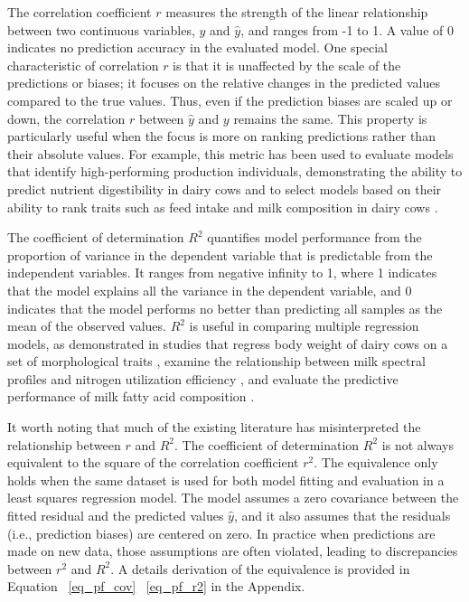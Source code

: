 The correlation coefficient \(r\) measures the strength of the linear relationship between two continuous variables, \(y\) and \(\hat{y}\), and ranges from -1 to 1. A value of 0 indicates no prediction accuracy in the evaluated model. One special characteristic of correlation \(r\) is that it is unaffected by the scale of the predictions or biases; it focuses on the relative changes in the predicted values compared to the true values. Thus, even if the prediction biases are scaled up or down, the correlation \(r\) between \(\hat{y}\) and \(y\) remains the same. This property is particularly useful when the focus is more on ranking predictions rather than their absolute values. For example, this metric has been used to evaluate models that identify high-performing production individuals, demonstrating the ability to predict nutrient digestibility in dairy cows \citep{de_souza_predicting_2018} and to select models based on their ability to rank traits such as feed intake and milk composition in dairy cows \citep{dorea_mining_2018,rovere_prediction_2021}.

The coefficient of determination \(R^2\) quantifies model performance from the proportion of variance in the dependent variable that is predictable from the independent variables. It ranges from negative infinity to 1, where 1 indicates that the model explains all the variance in the dependent variable, and 0 indicates that the model performs no better than predicting all samples as the mean of the observed values. \(R^2\) is useful in comparing multiple regression models, as demonstrated in studies that regress body weight of dairy cows on a set of morphological traits \citep{xavier_use_2022}, examine the relationship between milk spectral profiles and nitrogen utilization efficiency \citep{grelet_potential_2020}, and evaluate the predictive performance of milk fatty acid composition \citep{mantysaari_body_2019}.

It worth noting that much of the existing literature has misinterpreted the relationship between $r$ and $R^2$. The coefficient of determination $R^2$ is not always equivalent to the square of the correlation coefficient $r^2$. The equivalence only holds when the same dataset is used for both model fitting and evaluation in a least squares regression model. The model assumes a zero covariance between the fitted residual and the predicted values $\hat{y}$, and it also assumes that the residuals (i.e., prediction biases) are centered on zero. In practice when predictions are made on new data, those assumptions are often violated, leading to discrepancies between $r^2$ and $R^2$. A details derivation of the equivalence is provided in Equation ~\ref{eq_pf_cov} ~\ref{eq_pf_r2} in the Appendix.



